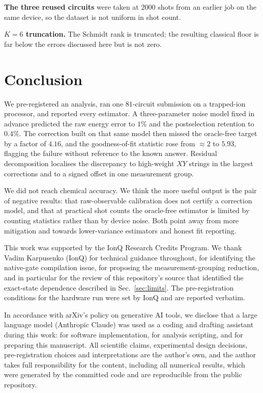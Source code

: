 \documentclass[aps,prx,twocolumn,superscriptaddress,nofootinbib,floatfix]{revtex4-2}
\begin{document}
\textbf{The three reused circuits} were taken at $2000$ shots from an
earlier job on the same device, so the dataset is not uniform in shot
count.

\textbf{$K=6$ truncation.} The Schmidt rank is truncated; the resulting
classical floor is far below the errors discussed here but is not zero.

\section{Conclusion}

We pre-registered an analysis, ran one $81$-circuit submission on a
trapped-ion processor, and reported every estimator. A three-parameter
noise model fixed in advance predicted the raw energy error to $1\%$ and
the postselection retention to $0.4\%$. The correction built on that same
model then missed the oracle-free target by a factor of $4.16$, and the
goodness-of-fit statistic rose from $\approx2$ to $5.93$, flagging the
failure without reference to the known answer. Residual decomposition
localises the discrepancy to high-weight $XY$ strings in the largest
corrections and to a signed offset in one measurement group.

We did not reach chemical accuracy. We think the more useful output is the
pair of negative results: that raw-observable calibration does not certify
a correction model, and that at practical shot counts the oracle-free
estimator is limited by counting statistics rather than by device noise.
Both point away from more mitigation and towards lower-variance
estimators and honest fit reporting.

\begin{acknowledgments}
This work was supported by the IonQ Research Credits Program. We thank
Vadim Karpusenko (IonQ) for technical guidance throughout, for identifying
the native-gate compilation issue, for proposing the measurement-grouping
reduction, and in particular for the review of this repository's source
that identified the exact-state dependence described in
Sec.~\ref{sec:limits}. The pre-registration conditions for the hardware
run were set by IonQ and are reported verbatim.

In accordance with arXiv's policy on generative AI tools, we disclose that
a large language model (Anthropic Claude) was used as a coding and drafting
assistant during this work: for software implementation, for analysis
scripting, and for preparing this manuscript. All scientific claims,
experimental design decisions, pre-registration choices and
interpretations are the author's own, and the author takes full
responsibility for the content, including all numerical results, which were
generated by the committed code and are reproducible from the public
repository.
\end{acknowledgments}
\end{document}
